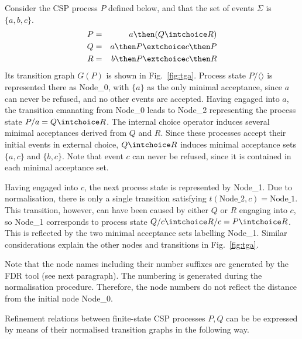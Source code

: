 \begin{example}\label{ex:a}
Consider the CSP process $P$ defined below, and that the set of events
$\Sigma$ is $\{a,b,c\}$.
\begin{eqnarray*}
P & = & a \then (Q\intchoice R)
\\
Q & = & a \then P \extchoice c \then P
\\
R & = & b \then P \extchoice c \then R
\end{eqnarray*}
Its transition graph $G(P)$ is shown in Fig.~\ref{fig:tga}. Process state
$P/\langle\rangle$ is represented there as Node\_0, with $\{ a\}$ as the
only minimal acceptance, since $a$ can never be refused, and no other events are
accepted. Having engaged into $a$, the transition emanating from Node\_0
leads to Node\_2 representing  the process state $P/a = Q\intchoice R$. The
internal choice operator induces several minimal acceptances derived from $Q$ and
$R$. Since these processes accept their initial events in external choice,
$Q\intchoice R$ induces minimal acceptance sets $\{a,c\}$ and
$\{b,c\}$. Note that event $c$ can never be refused, since it is contained in each minimal acceptance set.

Having engaged into $c$, the next process state is represented by Node\_1.
Due to normalisation, there is only a single transition satisfying
$t(\text{Node\_2},c) = \text{Node\_1}$. This transition, however, can have
been caused by either $Q$ or $R$ engaging into $c$, so Node\_1 corresponds to
process state $Q/c \intchoice R/c = P \intchoice R$. This is reflected by the
two minimal acceptance sets labelling Node\_1.
Similar considerations explain the other nodes and transitions in
Fig.~\ref{fig:tga}.

Note that the node names including their number suffixes 
are generated by the FDR tool (see next paragraph).
The numbering is generated   during the normalisation procedure.
Therefore, the node numbers do not reflect the distance from the initial node
Node\_0.
\xbox
\end{example}

Refinement relations between finite-state CSP processes $P, Q$ 
can be be expressed by means of their normalised transition graphs in the following way.

